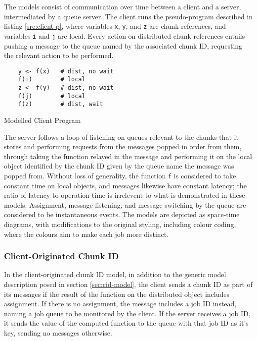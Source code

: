 The models consist of communication over time between a client and a server,
intermediated by a queue server.
The client runs the pseudo-program described in listing \cref{src:client-p},
where variables \texttt{x}, \texttt{y}, and \texttt{z} are chunk references,
and variables \texttt{i} and \texttt{j} are local. 
Every action on distributed chunk references entails pushing a  message to the
queue named by the associated chunk ID, requesting the relevant action to be
performed.

\begin{listing}
\begin{verbatim}
	y <- f(x)	# dist, no wait
	f(i)		# local
	z <- f(y)	# dist, no wait
	f(j)		# local
	f(z)		# dist, wait
\end{verbatim}
\caption{Modelled Client Program}\label{src:client-p}
\end{listing}

The server follows a loop of listening on queues relevant to the chunks that it
stores and performing requests from the messages popped in order from them,
through taking the function relayed in the message and performing it on the
local object identified by the chunk ID given by the queue name the message was
popped from.
Without loss of generality, the function \texttt{f} is considered to take
constant time on local objects, and messages likewise have constant latency;
the ratio of latency to operation time is irrelevent to what is demonstrated in
these models.
Assignment, message listening, and message switching by the queue are
considered to be instantaneous events.
The models are depicted as space-time diagrams, with modifications to the
original styling\cite{lamport1978ordering}, including colour coding, where the
colours aim to make each job more distinct.

\subsubsection{Client-Originated Chunk ID}

In the client-originated chunk ID  model, in addition to the generic model
description posed in section \cref{sec:cid-model}, the client sends a chunk ID
as part of its messages if the result of the function on the distributed object
includes assignment.
If there is no assignment, the message includes a job ID instead, naming a job
queue to be monitored by the client.
If the server receives a job ID, it sends the value of the computed function to
the queue with that job ID as it's key, sending no messages otherwise.

